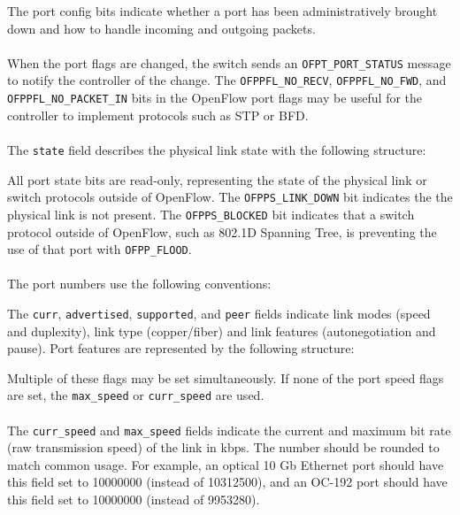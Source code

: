 
The port config bits indicate whether a port has been administratively brought down and how to handle incoming and outgoing packets.
\\\\
When the port flags are changed, the switch sends an \verb|OFPT_PORT_STATUS| message to notify the controller of the change. The \verb|OFPPFL_NO_RECV|, \verb|OFPPFL_NO_FWD|, and \verb|OFPPFL_NO_PACKET_IN| bits in the OpenFlow port flags may be useful for the controller to implement protocols such as STP or BFD.
\\\\
The \verb|state| field describes the physical link state with the following structure:


All port state bits are read-only, representing the state of the physical link or switch protocols outside of OpenFlow. The \verb|OFPPS_LINK_DOWN| bit indicates the the physical link is not present. The \verb|OFPPS_BLOCKED| bit indicates that a switch protocol outside of OpenFlow, such as 802.1D Spanning Tree, is preventing the use of that port with \verb|OFPP_FLOOD|.
\\\\
The port numbers use the following conventions:


The \verb|curr|, \verb|advertised|, \verb|supported|, and \verb|peer| fields indicate link modes (speed and duplexity), link type (copper/fiber) and link features (autonegotiation and pause).  Port features are represented by the following structure:


Multiple of these flags may be set simultaneously. If none of the port speed flags are set, the \verb|max_speed| or \verb|curr_speed| are used.
\\\\
The \verb|curr_speed| and \verb|max_speed| fields indicate the current and maximum bit rate (raw transmission speed) of the link in kbps. The number should be rounded to match common usage. For example, an optical 10 Gb Ethernet port should have this field set to 10000000 (instead of 10312500), and an OC-192 port should have this field set to 10000000 (instead of 9953280).

